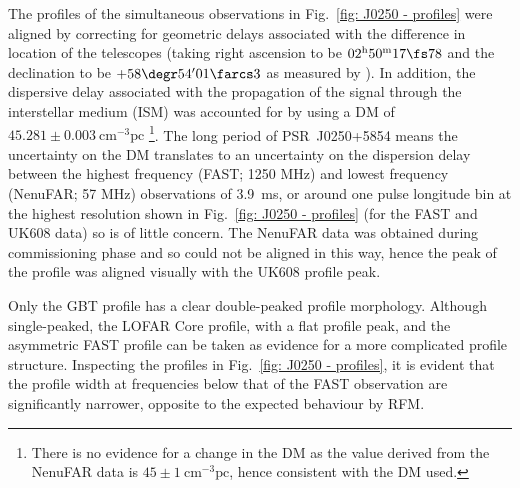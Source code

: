 The profiles of the simultaneous observations in Fig.~\ref{fig: J0250 - profiles} were aligned by correcting for geometric delays associated with the difference in location of the telescopes (taking right ascension to be $02^\mathrm{h}50^\mathrm{m}17\fs78$ and the declination to be $+58\degr54'01\farcs3$ as measured by \citealt{TBC+2018}). In addition, the dispersive delay associated with the propagation of the signal through the interstellar medium (ISM) was accounted for by using a DM of $45.281\pm0.003\ \mathrm{cm}^{-3}\mathrm{pc}$ \citep{TBC+2018}\footnote{There is no evidence for a change in the DM as the value derived from the NenuFAR data is $45\pm1\ \mathrm{cm}^{-3}\mathrm{pc}$, hence consistent with the DM used.}. The long period of PSR~J0250+5854 means the uncertainty on the DM translates to an uncertainty on the dispersion delay between the highest frequency (FAST; 1250 MHz) and lowest frequency (NenuFAR; 57 MHz) observations of 3.9~ms, or around one pulse longitude bin at the highest resolution shown in Fig.~\ref{fig: J0250 - profiles} (for the FAST and UK608 data) so is of little concern. The NenuFAR data was obtained during commissioning phase and so could not be aligned in this way, hence the peak of the profile was aligned visually with the UK608 profile peak.

Only the GBT profile has a clear double-peaked profile morphology. Although single-peaked, the LOFAR Core profile, with a flat profile peak, and the asymmetric FAST profile can be taken as evidence for a more complicated profile structure. Inspecting the profiles in Fig.~\ref{fig: J0250 - profiles}, it is evident that the profile width at frequencies below that of the FAST observation are significantly narrower, opposite to the expected behaviour by RFM. 

